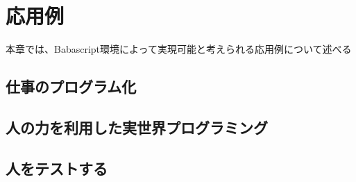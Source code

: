 \chapter{応用例}
\label{chap:application}

本章では、Babascript環境によって実現可能と考えられる応用例について述べる

\section{仕事のプログラム化}
\section{人の力を利用した実世界プログラミング}
\section{人をテストする}
